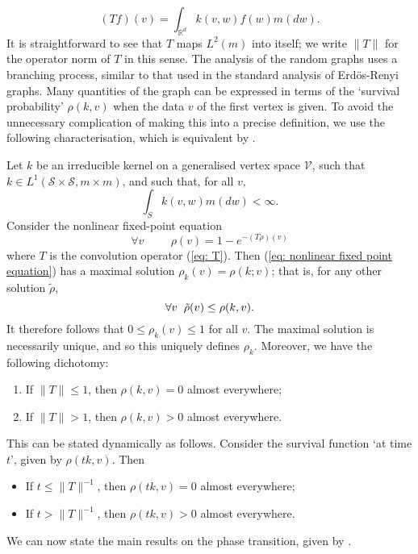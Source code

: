 \begin{equation}\label{eq: T}
       (T f)(v)=\int_{\mathbb{R}^d} k(v,w)f(w)m(dw). 
   \end{equation}  It is straightforward to see that $T$ maps $L^2(m)$ into itself; we write $\|T\|$ for the operator norm of $T$ in this sense.  The analysis of the random graphs uses a branching process, similar to that used in the standard analysis of Erd\"os-Renyi graphs. Many quantities of the graph can be expressed in terms of the `survival probability' $\rho(k, v)$ when the data $v$ of the first vertex is given. To avoid the unnecessary complication of making this into a precise definition, we use the following characterisation, which is equivalent by \cite[Theorem 6.2]{BJR07}.
   \begin{lemma}\label{lemma: survival function}
       Let $k$ be an irreducible kernel on a generalised vertex space $\mathcal{V}$, such that $k \in L^1(\mathcal{S}\times \mathcal{S}, m \times m)$, and such that, for all $v,$ \begin{equation} \label{eq: BJR 51}
           \int_S k(v,w)m(dw)<\infty.
       \end{equation} Consider the nonlinear fixed-point equation 
      \begin{equation} \label{eq: nonlinear fixed point equation} 
        \forall v\hspace{1cm}  {\rho}(v)=1-e^{-(T{\rho})(v)}
      \end{equation} where $T$ is the convolution operator (\ref{eq: T}). Then (\ref{eq: nonlinear fixed point equation}) has a maximal solution $\rho_k(v)=\rho(k;v)$; that is, for any other solution $\tilde{\rho}$, \begin{equation}
          \forall v \hspace{0.2cm} \tilde{\rho}(v)\leq \rho(k,v).
      \end{equation} It therefore follows that $0\leq \rho_k(v)\leq 1$ for all $v$. The maximal solution is necessarily unique, and so this uniquely defines $\rho_k.$ Moreover, we have the following dichotomy:
      \begin{enumerate}[label=\roman{*}).]
          \item If $\|T\|\leq 1$, then $\rho(k, v)=0$ almost everywhere;
          \item If $\|T\|> 1$, then $\rho(k, v)>0$ almost everywhere.
      \end{enumerate} This can be stated dynamically as follows. Consider the survival function `at time $t$', given by $\rho(tk,v)$. Then 
      \begin{itemize}
          \item If $t\leq \|T\|^{-1}$, then $\rho(tk, v)=0$ almost everywhere;
          \item If $t>\|T\|^{-1}$, then $\rho(tk, v)>0$ almost everywhere.
      \end{itemize}
      
   \end{lemma} We can now state the main results on the phase transition, given by \cite[Theorem 3.1 and Corollary 3.2]{BJR07}.
